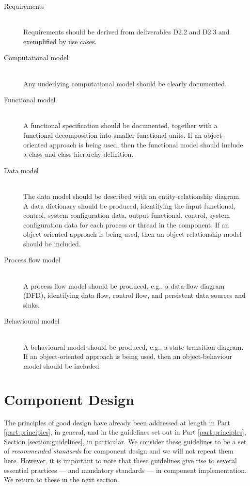 \documentclass{CSSRforAfrica}
\begin{document}
\begin{description}
\item [Requirements]~\\Requirements should be derived from deliverables D2.2 and D2.3 and exemplified by use cases.
\item [Computational model]~\\Any underlying computational model should be clearly documented.
\item [Functional model]~\\A functional specification should be documented, together with a functional decomposition into smaller functional units.  If an object-oriented approach is being used, then the functional model should include a class and class-hierarchy definition.
\item [Data model]~\\The data model should be described with an entity-relationship diagram. A data dictionary should be produced, identifying the input functional, control, system configuration data, output functional, control, system configuration data for each process or thread in the component. If an object-oriented approach is being used, then an object-relationship model should be included.
\item [Process flow model]~\\A process flow model should be produced, e.g., a  data-flow diagram (DFD), identifying data flow, control flow, and persistent data sources and sinks.
\item [Behavioural model]~\\A behavioural model should be produced, e.g., a state transition diagram. If an object-oriented approach is being used, then an object-behaviour model should be included.
\end{description} 

 

\section{Component Design}
\label{section:component_design}

The principles of good design have already been addressed at length in Part \ref{part:principles}, in general, and in the guidelines set out in Part \ref{part:principles}, Section \ref{section:guidelines}, in particular.  We consider these guidelines to be a set of {\em recommended standards} for component design and we will not repeat them here.  However, it is important to note that these guidelines give rise to several essential practices --- and mandatory standards --- in component implementation.  We return to these in the next section. 
 
\end{document}

